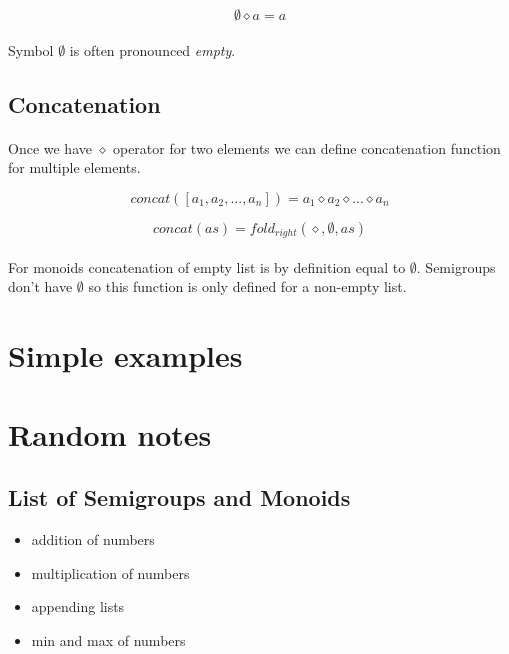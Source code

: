 \documentclass{article}
\begin{document}
    \begin{equation}
        \emptyset \diamond a = a
    \end{equation}

    \paragraph{}
    Symbol $\emptyset$ is often pronounced \textit{empty}.

\subsection{Concatenation}

    \paragraph{}
    Once we have $\diamond$ operator for two elements we can define concatenation function for multiple elements.

    \begin{equation}
        concat([a_1, a_2, ..., a_n]) = a_1 \diamond a_2 \diamond ... \diamond a_n
    \end{equation}

    \begin{equation}
        concat(as) = fold_{right}(\diamond, \emptyset, as)
    \end{equation}

    \paragraph{}
    For monoids concatenation of empty list is by definition equal to $\emptyset$.
    Semigroups don't have $\emptyset$ so this function is only defined for a non-empty list. 

\section{Simple examples}


\newpage
\section{Random notes}
\subsection{List of Semigroups and Monoids}

\begin{itemize}
    \item addition of numbers
    \item multiplication of numbers
    \item appending lists
    \item min and max of numbers
\end{itemize}
\end{document}
